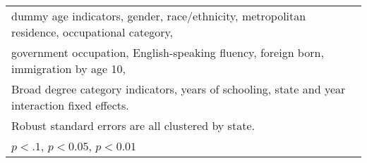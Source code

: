 \begin{table}[htbp]
\begin{tabular}{l*{3}{c}}
\multicolumn{4}{l}{\footnotesize dummy age indicators, gender, race/ethnicity, metropolitan residence, occupational category,}\\
\multicolumn{4}{l}{\footnotesize government occupation, English-speaking fluency, foreign born, immigration by age 10,}\\
\multicolumn{4}{l}{\footnotesize Broad degree category indicators, years of schooling, state and year interaction fixed effects.}\\
\multicolumn{4}{l}{\footnotesize Robust standard errors are all clustered by state.}\\
\multicolumn{4}{l}{\footnotesize \sym{*} \(p<.1\), \sym{**} \(p<0.05\), \sym{***} \(p<0.01\)}\\
\end{tabular}
\end{table}
